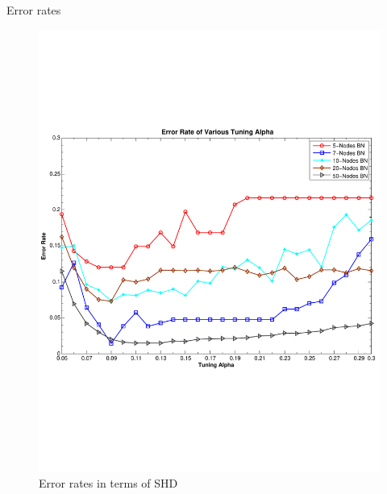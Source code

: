 \begin{frame}{Error rates}
\begin{figure}
\vspace{-2cm}
\centering
\includegraphics[scale=0.35]{imgs/ErrorRate-copula}
\vspace{-2.2cm}
\caption{Error rates in terms of SHD}
\end{figure} 
\end{frame}
